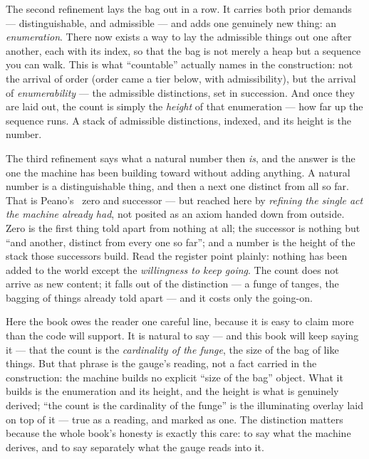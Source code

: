 The second refinement lays the bag out in a row. It carries both prior demands --- distinguishable, and admissible ---
and adds one genuinely new thing: an \emph{enumeration}. There now exists a way to lay the admissible things out one
after another, each with its index, so that the bag is not merely a heap but a sequence you can walk. This is what
``countable'' actually names in the construction: not the arrival of order (order came a tier below, with
admissibility), but the arrival of \emph{enumerability} --- the admissible distinctions, set in succession. And once
they are laid out, the count is simply the \emph{height} of that enumeration --- how far up the sequence runs. A stack
of admissible distinctions, indexed, and its height is the number.

The third refinement says what a natural number then \emph{is}, and the answer is the one the machine has been
building toward without adding anything. A natural number is a distinguishable thing, and then a next one distinct
from all so far. That is Peano's~\cite{peano1889} zero and successor --- but reached here by \emph{refining the single
act the machine already had}, not posited as an axiom handed down from outside. Zero is the first thing told apart
from nothing at all; the successor is nothing but ``and another, distinct from every one so far''; and a number is the
height of the stack those successors build. Read the register point plainly: nothing has been added to the world
except the \emph{willingness to keep going}. The count does not arrive as new content; it falls out of the distinction
--- a funge of tanges, the bagging of things already told apart --- and it costs only the going-on.

Here the book owes the reader one careful line, because it is easy to claim more than the code will support. It is
natural to say --- and this book will keep saying it --- that the count is the \emph{cardinality of the funge}, the
size of the bag of like things. But that phrase is the gauge's reading, not a fact carried in the construction: the
machine builds no explicit ``size of the bag'' object. What it builds is the enumeration and its height, and the
height is what is genuinely derived; ``the count is the cardinality of the funge'' is the illuminating overlay laid on
top of it --- true as a reading, and marked as one. The distinction matters because the whole book's honesty is
exactly this care: to say what the machine derives, and to say separately what the gauge reads into it.

